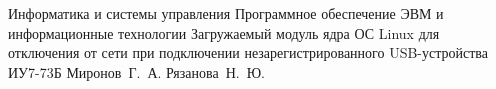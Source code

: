 \documentclass{bmstu}
\begin{document}
\makecourseworktitle
{Информатика и системы управления}
{Программное обеспечение ЭВМ и информационные технологии}
{Загружаемый модуль ядра ОС Linux для отключения от сети при подключении незарегистрированного USB-устройства}
{ИУ7-73Б}
{Миронов~Г.~А.}
{Рязанова~Н.~Ю.}
{}
{}
\setcounter{page}{3}



\maketableofcontents








\makebibliography


\end{document}
